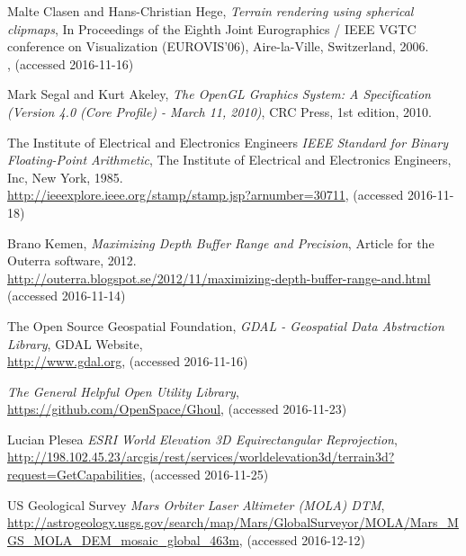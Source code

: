 \begin{thebibliography}{99}
  Malte Clasen and Hans-Christian Hege,
  \emph{Terrain rendering using spherical clipmaps},
  In Proceedings of the Eighth Joint Eurographics / IEEE VGTC conference on Visualization (EUROVIS'06),
  Aire-la-Ville, Switzerland,
  2006. \\
  ,
  (accessed 2016-11-16)

  Mark Segal and Kurt Akeley,
  \emph{The OpenGL Graphics System: A Specification (Version 4.0 (Core Profile) - March 11, 2010)},
  CRC Press,
  1st edition,
  2010.

  The Institute of Electrical and Electronics Engineers
  \emph{IEEE Standard for Binary Floating-Point Arithmetic},
  The Institute of Electrical and Electronics Engineers, Inc,
  New York,
  1985. \\
  \url{http://ieeexplore.ieee.org/stamp/stamp.jsp?arnumber=30711},
  (accessed 2016-11-18)
  
  Brano Kemen,
  \emph{Maximizing Depth Buffer Range and Precision},
  Article for the Outerra software,
  2012. \\
  \url{http://outerra.blogspot.se/2012/11/maximizing-depth-buffer-range-and.html}
  (accessed 2016-11-14)

  The Open Source Geospatial Foundation,
  \emph{GDAL - Geospatial Data Abstraction Library},
  GDAL Website,
  \\
  \url{http://www.gdal.org},
  (accessed 2016-11-16)
  
  \emph{The General Helpful Open Utility Library},
  \\
  \url{https://github.com/OpenSpace/Ghoul},
  (accessed 2016-11-23)
  
  Lucian Plesea
  \emph{ESRI World Elevation 3D Equirectangular Reprojection},
  \\
  \url{http://198.102.45.23/arcgis/rest/services/worldelevation3d/terrain3d?request=GetCapabilities},
  (accessed 2016-11-25)
  
  US Geological Survey
  \emph{Mars Orbiter Laser Altimeter (MOLA) DTM},
  \\
  \url{http://astrogeology.usgs.gov/search/map/Mars/GlobalSurveyor/MOLA/Mars_MGS_MOLA_DEM_mosaic_global_463m},
  (accessed 2016-12-12)
  
  
  
\end{thebibliography}
